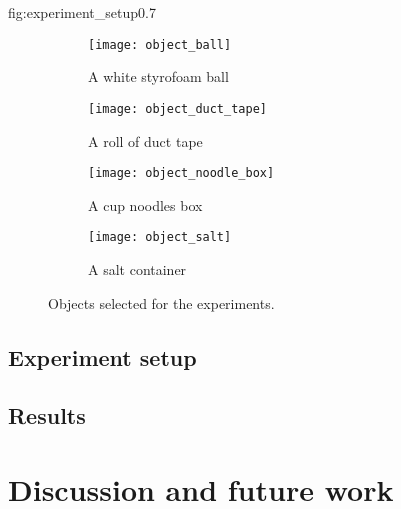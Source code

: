              {fig:experiment_setup}{0.7\textwidth}

\begin{figure}[htb]
    \centering
    \small
    \begin{subfigure}[b]{0.45\textwidth}
        \texttt{[image: object\_ball]}
        \caption{A white styrofoam ball}
        \label{fig:object_ball}
    \end{subfigure}
    \hfill
    \begin{subfigure}[b]{0.45\textwidth}
        \texttt{[image: object\_duct\_tape]}
        \caption{A roll of duct tape}
        \label{fig:object_duct_tape}
    \end{subfigure}

    \begin{subfigure}[b]{0.45\textwidth}
        \texttt{[image: object\_noodle\_box]}
        \caption{A cup noodles box}
        \label{fig:object_noodle_box}
    \end{subfigure}
    \hfill
    \begin{subfigure}[b]{0.45\textwidth}
    \texttt{[image: object\_salt]}
    \caption{A salt container}
    \label{fig:object_salt}
    \end{subfigure}
    \caption{Objects selected for the experiments.}\label{fig:objects}
\end{figure}

\subsection{Experiment setup}

\subsection{Results}

\pagebreak
\section{Discussion and future work}
